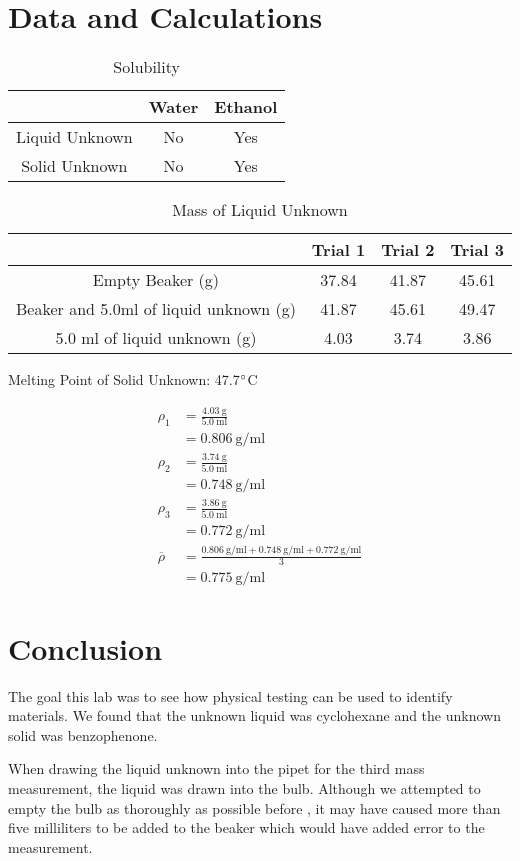 \documentclass[12pt]{article}
\begin{document}
    \section*{Data and Calculations}
        \begin{table}[H]
            \centering
            \caption{Solubility}
            \begin{tabular}{c|cc}
                &Water&Ethanol\\
                \hline
                Liquid Unknown & No & Yes\\
                Solid Unknown & No & Yes
            \end{tabular}
        \end{table}
        \begin{table}[H]
            \centering
            \caption{Mass of Liquid Unknown}
            \begin{tabular}{c|ccc}
                & Trial 1 & Trial 2 & Trial 3\\
                \hline
                Empty Beaker (g) & 37.84 & 41.87 & 45.61\\
                Beaker and 5.0ml of liquid unknown (g) & 41.87 & 45.61 & 49.47 \\
                \hline
                5.0 ml of liquid unknown (g) & 4.03 & 3.74 & 3.86
            \end{tabular}
        \end{table}
        \begin{center}
            Melting Point of Solid Unknown: 47.7\(\degree\)C\\ 
        \end{center}
        \begin{align*}
            \rho_1 & = \frac{4.03~\mathrm{g}}{5.0~\mathrm{ml}}\\
            & = 0.806~\mathrm{g/ml}\\
            \rho_2 & = \frac{3.74~\mathrm{g}}{5.0~\mathrm{ml}}\\
            &= 0.748 ~\mathrm{g/ml}\\
            \rho_3 & = \frac{3.86~\mathrm{g}}{5.0~\mathrm{ml}}\\
            &= 0.772 ~\mathrm{g/ml}\\
            \overline{\rho} &= \frac{0.806~\mathrm{g/ml}+0.748~\mathrm{g/ml}+0.772~\mathrm{g/ml}}{3}\\
            &= 0.775~\mathrm{g/ml}
        \end{align*}
    \section*{Conclusion}
        The goal this lab was to see how physical testing can be used to identify materials. We found that the unknown liquid was cyclohexane and the unknown solid was benzophenone. 

        When drawing the liquid unknown into the pipet for the third mass measurement, the liquid was drawn into the bulb. Although we attempted to empty the bulb as thoroughly as possible before , it may have caused more than five milliliters to be added to the beaker which would have added error to the measurement. 
\end{document}
